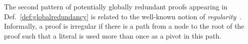 \documentclass[envcountsame]{llncs}
\begin{document}



The second pattern of potentially globally redundant proofs appearing in
Def.~\ref{def:globalredundancy} is related to the well-known notion of
\emph{regularity}~\cite{Tseitin1983On-The-Complexity-of-Proofs-in-Propositional-Logics}. %
Informally, a proof is irregular if there is a path from a node to the root of
the proof such that a literal is used more than once as a pivot in this path. 
\end{document}
